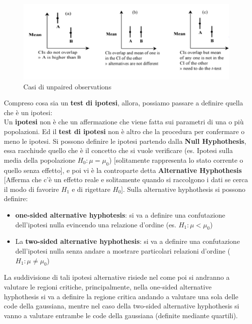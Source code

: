\begin{figure}[h]
\centering
\includegraphics[width=.7\textwidth]{img/chapter-4/unpaired-observations.png}
\caption{Casi di unpaired observations}\label{img:unpaired-observations}
\end{figure}

Compreso cosa sia un \textbf{test di ipotesi}, allora, possiamo passare a definire quella che è un ipotesi:
\\
Un \textbf{ipotesi} non è che un affermazione che viene fatta sui parametri di una o più popolazioni. Ed il \textbf{test di ipotesi} non è altro che la procedura per confermare o meno le ipotesi. Si possono definire le ipotesi partendo dalla \textbf{Null Hyphothesis}, essa racchiude quello che è il concetto che si vuole verificare (es. Ipotesi sulla media della popolazione \(H_0: \mu = \mu_0\)) [solitamente rappresenta lo stato corrente o quello senza effetto], e poi vi è la controparte detta \textbf{Alternative Hyphothesis} [Afferma che c'è un effetto reale e solitamente quando si raccolgono i dati se cerca il modo di favorire \(H_1\) e di rigettare \(H_0\)]. Sulla alternative hyphothesis si possono definire:
\begin{itemize}
    \item \textbf{one-sided alternative hyphotesis}: si va a definire una confutazione dell'ipotesi nulla evincendo una relazione d'ordine (es. \(H_1: \mu < \mu_0 \))
    \item La \textbf{two-sided alternative hyphothesis}: si va a definire una confutazione dell'ipotesi nulla senza andare a mostrare particolari relazioni d'ordine (\(H_1:\mu \not = \mu_0\))
\end{itemize}

La suddivisione di tali ipotesi alternative risiede nel come poi si andranno a valutare le regioni critiche, principalmente, nella one-sided alternative hyphothesis si va a definire la regione critica andando a valutare una sola delle code della gaussiana, mentre nel caso della two-sided alternative hyphothesis si vanno a valutare entrambe le code della gaussiana (definite mediante quartili).

